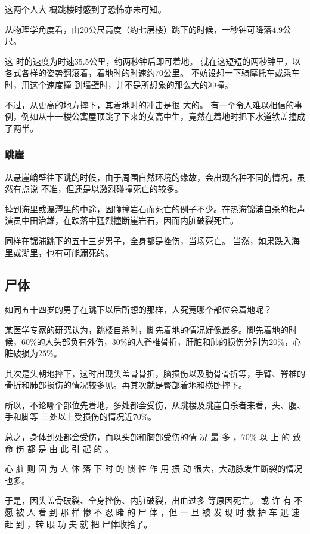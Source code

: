 \documentclass[UTF8]{ctexart}
\begin{document}
这两个人大 概跳楼时感到了恐怖亦未可知。 

从物理学角度看，由$20$公尺高度（约七层楼）跳下的时候，一秒钟可降落$4.9$公尺。

这 时的速度为时速$35.5$公里，约两秒钟后即可着地。
就在这短短的两秒钟里，以各式各样的姿势翻滚着，着地时的时速约$70$公里。
不妨设想一下骑摩托车或乘车时，用这个速度撞 到墙壁时，并不是所想象的那么大的冲撞。

不过，从更高的地方摔下，其着地时的冲击是很 大的。
有一个令人难以相信的事例，例如从十一楼公寓屋顶跳了下来的女高中生，竟然在着地时把下水道铁盖撞成了两半。

\subsubsection*{跳崖}

从悬崖峭壁往下跳的时候，由于周围自然环境的缘故，会出现各种不同的情况，虽然有点说
不准，但还是以激烈碰撞死亡的较多。

掉到海里或瀑潭里的中途，因碰撞岩石而死亡的例子不少。在热海锦浦自杀的相声演员中田治雄，在跌落中猛烈撞断崖岩石，因而内脏破裂死亡。

同样在锦浦跳下的五十三岁男子，全身都是挫伤，当场死亡。
当然，如果跌入海里或湖里，也有可能溺死的。

\subsection{尸体}

如同五十四岁的男子在跳下以后所想的那样，人究竟哪个部位会着地呢？

某医学专家的研究认为，跳楼自杀时，脚先着地的情况好像最多。脚先着地的时候，$60\%$的人头部负有外伤，$30\%$的人脊椎骨折，肝脏和肺的损伤分别为$20\%$，心 脏破损为$25\%$。

其次是头朝地摔下，这时出现头盖骨骨折，脑损伤以及肋骨骨折等，手臂、脊椎的骨折和肺部损伤的情况较多见。再其次就是臀部着地和横卧摔下。

所以，不论哪个部位先着地，多处都会受伤，从跳楼及跳崖自杀者来看，头、腹、手和脚等 三处以上受损伤的情况近$70\%$。

总之，身体到处都会受伤，而以头部和胸部受伤的情 况 最 多 ，$70\%$ 以 上 的 致 命 伤 都 是 由 此 引 起 的 。

心 脏 则 因 为 人 体 落 下 时 的 惯 性 作 用 振 动 很大，大动脉发生断裂的情况也多。

于是，因头盖骨破裂、全身挫伤、内脏破裂，出血过多 等原因死亡。 
或 许 有 不 愿 被 人 看 到 那 样 惨 不 忍 睹 的 尸 体 ，但 一 旦 被 发 现 时 救 护 车 迅 速 赶 到 ，转 眼 功 夫 就 把 尸体收拾了。
\end{document}
